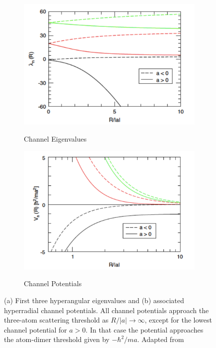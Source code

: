 \documentclass[prl,onecolumn,amsmath,amssymb,titlepage,nofootinbib,preprint]{revtex4-1}
\begin{document}
	  \begin{figure}
	  	\centering
		\begin{subfigure}[b]{0.45\textwidth}
			\caption{Channel Eigenvalues}
			\includegraphics[width=\textwidth]{Figures/hyperangular_eigenvalues}
			\label{fig:hyp_ang_eigenv}
		\end{subfigure}
		\begin{subfigure}[b]{0.45\textwidth}
			\caption{Channel Potentials}
			\includegraphics[width=\textwidth]{Figures/hyperradial_potentials}
			\label{fig:hyper_potentials}
		\end{subfigure}
		\caption{(a) First three hyperangular eigenvalues and (b) associated hyperradial channel potentials.  All channel potentials approach the three-atom scattering threshold as $R/|a|\rightarrow \infty$, except for the lowest channel potential for $a>0$.  In that case the potential approaches the atom-dimer threshold given by $-\hbar^{2}/m a$. Adapted from \cite{Braaten_2006}}
	\end{figure} 
	
\end{document}
